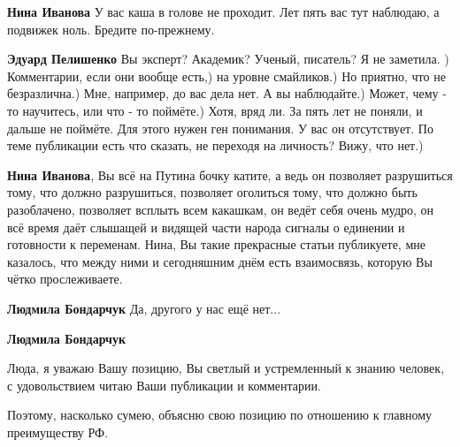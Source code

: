 \begin{itemize}
\begin{itemize}
\textbf{Нина Иванова} У вас каша в голове не проходит. Лет пять вас тут наблюдаю, а подвижек ноль. Бредите по-прежнему.

 
\textbf{Эдуард Пелишенко} Вы эксперт? Академик? Ученый, писатель? Я не заметила. ) Комментарии, если они вообще есть,) на уровне смайликов.) Но приятно, что не безразлична.) Мне, например, до вас дела нет. А вы наблюдайте.) Может, чему - то научитесь, или что - то поймёте.) Хотя, вряд ли. За пять лет не поняли, и дальше не поймёте. Для этого нужен ген понимания. У вас он отсутствует. По теме публикации есть что сказать, не переходя на личность? Вижу, что нет.)

 
\textbf{Нина Иванова}, Вы всё на Путина бочку катите, а ведь он позволяет разрушиться тому, что должно разрушиться, позволяет оголиться тому, что должно быть разоблачено, позволяет всплыть всем какашкам, он ведёт себя очень мудро, он всё время даёт слышащей и видящей части народа сигналы о единении и готовности к переменам. Нина, Вы такие прекрасные статьи публикуете, мне казалось, что между ними и сегодняшним днём есть взаимосвязь, которую Вы чётко прослеживаете.

 
\textbf{Людмила Бондарчук} Да, другого у нас ещё нет...

 
\textbf{Людмила Бондарчук} 

Люда, я уважаю Вашу позицию, Вы светлый и устремленный к знанию человек, с удовольствием читаю Ваши публикации и комментарии.

Поэтому, насколько сумею, объясню свою позицию по отношению к главному преимуществу РФ.


\end{itemize}
\end{itemize}
